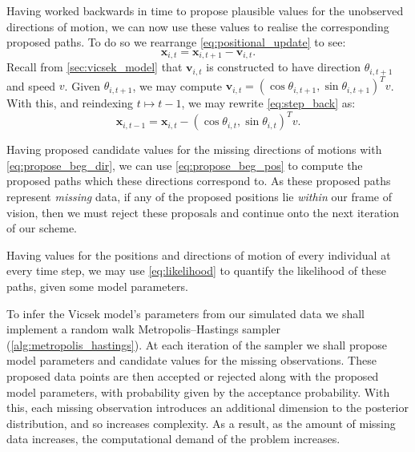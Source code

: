 Having worked backwards in time to propose plausible values for the unobserved
directions of motion, we can now use these values to realise the corresponding
proposed paths. To do so we rearrange \cref{eq:positional_update} to see:
\begin{equation}
  \label{eq:step_back}
  \bm{x}_{i,t} = \bm{x}_{i,t+1} - \bm{v}_{i,t}.
\end{equation}
Recall from \cref{sec:vicsek_model} that $\bm{v}_{i,t}$ is constructed to have
direction $\theta_{i,t+1}$ and speed $v$. Given $\theta_{i,t+1}$, we may
compute $\bm{v}_{i,t} = (\cos\theta_{i,t+1}, \sin\theta_{i,t+1})^Tv$. With
this, and reindexing $t\mapsto t-1$, we may rewrite \cref{eq:step_back} as:
\begin{equation}
  \label{eq:propose_beg_pos}
  \bm{x}_{i,t-1} = \bm{x}_{i,t} - (\cos\theta_{i,t}, \sin\theta_{i,t})^Tv.
\end{equation}

Having proposed candidate values for the missing directions of motions with
\cref{eq:propose_beg_dir}, we can use \cref{eq:propose_beg_pos} to compute the
proposed paths which these directions correspond to. As these proposed
paths represent \emph{missing} data, if any of the proposed positions lie
\emph{within} our frame of vision, then we must reject these proposals and
continue onto the next iteration of our scheme.

Having values for the positions and directions of motion of every individual at
every time step, we may use \cref{eq:likelihood} to quantify the likelihood of
these paths, given some model parameters.

To infer the Vicsek model's parameters from our simulated data we shall
implement a random walk Metropolis--Hastings sampler
(\cref{alg:metropolis_hastings}). At each iteration of the sampler we shall
propose model parameters and candidate values for the missing observations.
These proposed data points are then accepted or rejected along with the
proposed model parameters, with probability given by the acceptance
probability. With this, each missing observation introduces an additional
dimension to the posterior distribution, and so increases complexity. As a
result, as the amount of missing data increases, the computational demand
of the problem increases.

